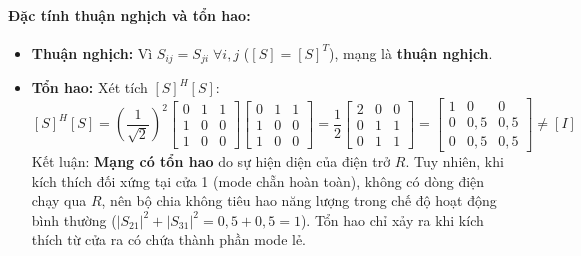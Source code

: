 \documentclass[12pt,a4paper]{article}
\begin{document}
\paragraph{Đặc tính thuận nghịch và tổn hao:}
\begin{itemize}
    \item \textbf{Thuận nghịch:} Vì $S_{ij} = S_{ji} \; \forall i, j$ ($[S] = [S]^T$), mạng là \textbf{thuận nghịch}.
    \item \textbf{Tổn hao:} Xét tích $[S]^H [S]$:
    \[
    [S]^H [S] = \left(\frac{1}{\sqrt{2}}\right)^2 \begin{bmatrix} 0 & 1 & 1 \\ 1 & 0 & 0 \\ 1 & 0 & 0 \end{bmatrix} \begin{bmatrix} 0 & 1 & 1 \\ 1 & 0 & 0 \\ 1 & 0 & 0 \end{bmatrix} = \frac{1}{2} \begin{bmatrix} 2 & 0 & 0 \\ 0 & 1 & 1 \\ 0 & 1 & 1 \end{bmatrix} = \begin{bmatrix} 1 & 0 & 0 \\ 0 & 0{,}5 & 0{,}5 \\ 0 & 0{,}5 & 0{,}5 \end{bmatrix} \neq [I]
    \]
    Kết luận: \textbf{Mạng có tổn hao} do sự hiện diện của điện trở $R$. Tuy nhiên, khi kích thích đối xứng tại cửa 1 (mode chẵn hoàn toàn), không có dòng điện chạy qua $R$, nên bộ chia không tiêu hao năng lượng trong chế độ hoạt động bình thường ($|S_{21}|^2 + |S_{31}|^2 = 0{,}5 + 0{,}5 = 1$). Tổn hao chỉ xảy ra khi kích thích từ cửa ra có chứa thành phần mode lẻ.
\end{itemize}
\end{document}
